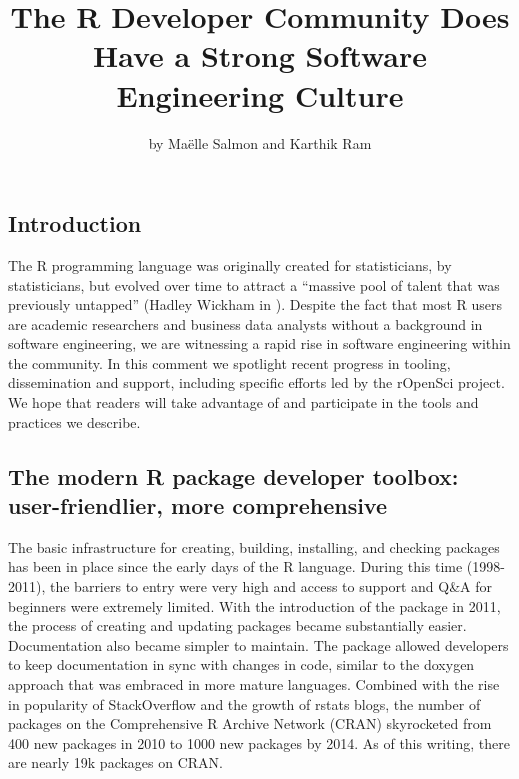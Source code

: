 \title{The R Developer Community Does Have a Strong Software Engineering
Culture}
\author{by Maëlle Salmon and Karthik Ram}

\maketitle


\hypertarget{introduction}{%
\subsection{Introduction}\label{introduction}}

The R programming language was originally created for statisticians, by
statisticians, but evolved over time to attract a ``massive pool of
talent that was previously untapped'' (Hadley Wickham in
\citet{rgeneration}). Despite the fact that most R users are academic
researchers and business data analysts without a background in software
engineering, we are witnessing a rapid rise in software engineering
within the community. In this comment we spotlight recent progress in
tooling, dissemination and support, including specific efforts led by
the rOpenSci project. We hope that readers will take advantage of and
participate in the tools and practices we describe.

\hypertarget{the-modern-r-package-developer-toolbox-user-friendlier-more-comprehensive}{%
\subsection{The modern R package developer toolbox: user-friendlier,
more
comprehensive}\label{the-modern-r-package-developer-toolbox-user-friendlier-more-comprehensive}}

The basic infrastructure for creating, building, installing, and
checking packages has been in place since the early days of the R
language. During this time (1998-2011), the barriers to entry were very
high and access to support and Q\&A for beginners were extremely
limited. With the introduction of the 
\citep{devtools} package in 2011, the process of creating and updating
packages became substantially easier. Documentation also became simpler
to maintain. The  \citep{roxygen2} package allowed
developers to keep documentation in sync with changes in code, similar
to the doxygen approach that was embraced in more mature languages.
Combined with the rise in popularity of StackOverflow and the growth of
rstats blogs, the number of packages on the Comprehensive R Archive
Network (CRAN) skyrocketed from 400 new packages in 2010 to 1000 new
packages by 2014. As of this writing, there are nearly 19k packages on
CRAN.

